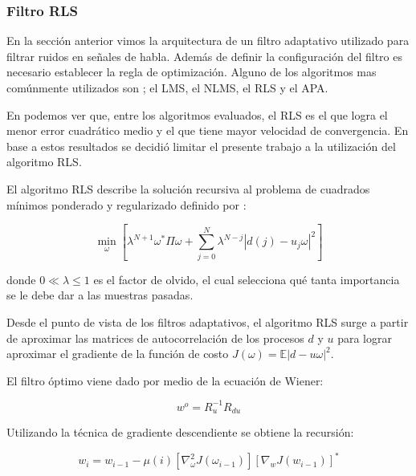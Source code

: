 \subsubsection{Filtro RLS}
\label{sec:adaptive_filter_rls}

En la sección anterior vimos la arquitectura de un filtro adaptativo utilizado para filtrar ruidos en señales de habla. Además de definir la configuración del filtro es necesario establecer la regla de optimización. Alguno de los algoritmos mas comúnmente utilizados son \cite{a_family_of_adaptive_filter_slgorithms_in_noise_cancellation_for_speech_enhancement}; el LMS, el NLMS, el RLS y el APA.

En \cite{a_family_of_adaptive_filter_slgorithms_in_noise_cancellation_for_speech_enhancement} podemos ver que, entre los algoritmos evaluados, el RLS es el que logra el menor error cuadrático medio y el que tiene mayor velocidad de convergencia. En base a estos resultados se decidió limitar el presente trabajo a la utilización del algoritmo RLS. 

El algoritmo RLS describe la solución recursiva al problema de cuadrados mínimos ponderado y regularizado definido por \cite{fundamentals_of_adaptive_filtering}:

\begin{equation*}
	\min_{ \omega} \left[\lambda^{N+1} \omega^* \Pi \omega + \sum_{j=0}^N \lambda^{N-j} |d(j) - u_j \omega |^2 \right]
\end{equation*}

\noindent donde $ 0 \ll \lambda \leq 1$ es el factor de olvido, el cual selecciona qué tanta importancia se le debe dar a las muestras pasadas. 

Desde el punto de vista de los filtros adaptativos, el algoritmo RLS surge a partir de aproximar las matrices de autocorrelación de los procesos $d$ y $u$ para lograr aproximar el gradiente de la función de costo $J(\omega) = \mathbb{E} | d - u \omega |^2$.

El filtro óptimo viene dado por medio de la ecuación de Wiener:

\begin{equation*}
	w^o = R_u^{-1}R_{du}
\end{equation*}

Utilizando la técnica de gradiente descendiente se obtiene la recursión:

\begin{equation*}
	w_i = w_{i-1} - \mu(i) \left[ \nabla^2_\omega J(\omega_{i-1}) \right] \left[ \nabla_w J(w_{i-1}) \right]^*
\end{equation*}

